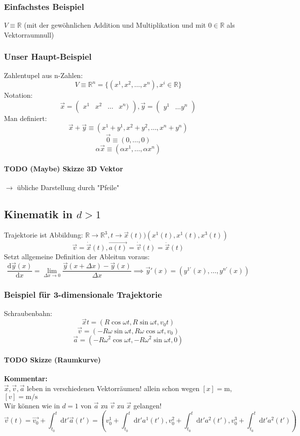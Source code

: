 \documentclass[a4paper]{scrartcl}
\theoremstyle{definition}
\theoremstyle{plain}
\theoremstyle{remark}
\theoremstyle{remark}
\begin{document}
\subsubsection{Einfachstes Beispiel}
\label{sec-2-4-1}
$V\equiv \mathbb{R}$ (mit der gewöhnlichen Addition und Multiplikation und mit $0\in\mathbb{R}$ als Vektorraumnull)
\subsubsection{Unser Haupt-Beispiel}
\label{sec-2-4-2}
Zahlentupel aus n-Zahlen:
\[V\equiv \mathbb{R}^n = \{(x^1,x^2,\ldots,x^n), x^i \in\mathbb{R}\}\]
Notation:
\[\vec{x} = \begin{pmatrix} x^1& x^2 & \ldots & x^n)\end{pmatrix}, \vec{y} = \begin{pmatrix} y^1 & \ldots y^n \end{pmatrix}\]
Man definiert:
\[\vec{x} + \vec{y} \equiv (x^1 + y^1, x^2 + y^2, \ldots, x^n + y^n)\]
\[\vec{0} \equiv (0,\ldots,0)\]
\[\alpha \vec{x} \equiv (\alpha x^1, \ldots, \alpha x^n)\]
\paragraph{{\bfseries\sffamily TODO} (Maybe) Skizze 3D Vektor}
\label{sec-2-4-2-1}
$\rightarrow$ übliche Darstellung durch "Pfeile"
\subsection{Kinematik in $d>1$}
\label{sec-2-5}
Trajektorie ist Abbildung: $\mathbb{R} \to \mathbb{R}^3, t\to \vec{x}(t) ) (x^1(t),x^1(t),x^3(t))$
\[\vec{v} = \dot{\vec{x}}(t), \vec{a(t)} = \dot{\vec{v}}(t) = \ddot{\vec{x}}(t)\]
Setzt allgemeine Definition der Ableitun voraus:
\[\frac{\mathrm{d}\vec{y}(x)}{\mathrm{d}x} = \lim_{\Delta x \to 0} \frac{\vec{y}(x + \Delta x) - \vec{y}(x)}{\Delta x}  \implies \vec{y}'(x) = (y^{1'}(x), \ldots,y^{n'}(x))\]
\subsubsection{Beispiel für 3-dimensionale Trajektorie}
\label{sec-2-5-1}
Schraubenbahn:
\[\vec{x}t = (R\cos{\omega t},R\sin{\omega t}, v_0 t)\]
\[\vec{v} = (-R\omega\sin{\omega t}, R\omega\cos{\omega t}, v_0)\]
\[\vec{a} = (-R\omega^2\cos{\omega t}, -R\omega^2\sin{\omega t}, 0)\]
\paragraph{{\bfseries\sffamily TODO} Skizze (Raumkurve)}
\label{sec-2-5-1-1}
\textbf{Kommentar:} \\
     $\vec{x},\vec{v},\vec{a}$ leben in verschiedenen Vektorräumen!
allein schon wegen $[x] = \si{\meter}$, $[v] = \si{\meter\per\second}$ \\
     Wir können wie in $d=1$ von $\vec{a}$ zu $\vec{v}$ zu $\vec{x}$ gelangen!
\[\vec{v}(t) = \vec{v_0} + \int_{t_0}^{t} \mathrm{d}t' \vec{a}(t') = (v_0^1 + \int_{t_0}^t \mathrm{d}t' a^1(t'), v_0^2 + \int_{t_0}^t \mathrm{d}t' a^2(t'), v_0^3 + \int_{t_0}^t \mathrm{d}t' a^2(t'))\]
\end{document}
